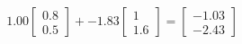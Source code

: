 \documentclass[preview]{standalone}
\begin{document}
\begin{align*}
1.00 \begin{bmatrix} 0.8 \\ 0.5 \end{bmatrix} + -1.83 \begin{bmatrix} 1 \\ 1.6 \end{bmatrix} = \begin{bmatrix} -1.03 \\ -2.43 \end{bmatrix}
\end{align*}
\end{document}
